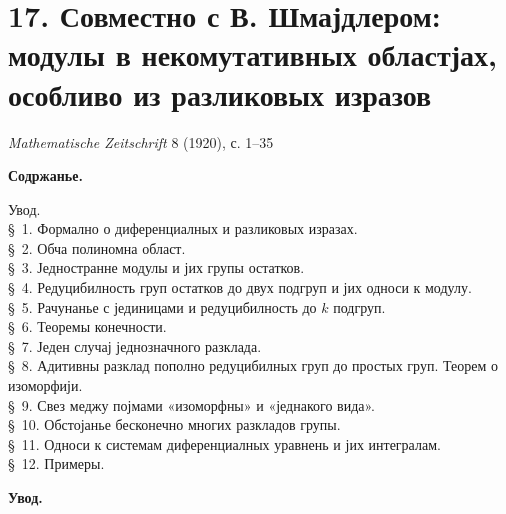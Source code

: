 ﻿\documentclass[11pt]{article}
\begin{document}

\setcounter{footnote}{0}
\section*{17. Совместно с В. Шмајдлером: модулы в некомутативных областјах, особливо из разликовых изразов}
\begin{center}
\emph{Mathematische Zeitschrift} 8 (1920), с. 1--35
\end{center}

\begin{center}
\textbf{Содржанье.}
\end{center}
\begin{center}
\begin{minipage}{0.88\linewidth}
Увод.\\
\S~1. Формално о диференциалных и разликовых изразах.\\
\S~2. Обча полиномна област.\\
\S~3. Једностранне модулы и јих групы остатков.\\
\S~4. Редуцибилность груп остатков до двух подгруп и јих односи к модулу.\\
\S~5. Рачунанье с јединицами и редуцибилность до \(k\) подгруп.\\
\S~6. Теоремы конечности.\\
\S~7. Једен случај једнозначного разклада.\\
\S~8. Адитивны разклад пополно редуцибилных груп до простых груп. Теорем о изоморфији.\\
\S~9. Свез меджу појмами «изоморфны» и «једнакого вида».\\
\S~10. Обстојанье бесконечно многих разкладов групы.\\
\S~11. Односи к системам диференциалных уравнень и јих интегралам.\\
\S~12. Примеры.
\end{minipage}
\end{center}

\begin{center}\textbf{Увод.}\end{center}
\end{document}
